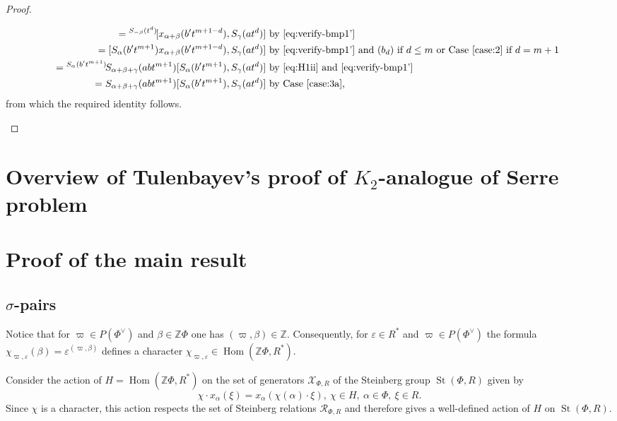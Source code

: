\documentclass[oneside, 10pt]{amsart}
\DeclareMathOperator{\St}{St}
\DeclareMathOperator{\Hom}{Hom}
\newcommand{\ZZ}{\mathbb{Z}}
\numberwithin{equation}{section}
\numberwithin{lemma}{section}
\theoremstyle{definition}
\theoremstyle{remark}
\begin{document}
\begin{proof}
\begin{enumerate}
\begin{enumerate}
\begin{align*}
 = {}^{S_{-\beta}(t^d)}\![x_{\alpha+\beta}(b't^{m+1-d}), S_\gamma(at^d)] & \text{ by~\eqref{eq:verify-bmp1'}} \\
 = [S_{\alpha}(b't^{m+1}) x_{\alpha+\beta}(b't^{m+1-d}), S_\gamma(at^d)] & \text{ by~\eqref{eq:verify-bmp1'} and $(b_d)$ if $d\leq m$ or Case~\eqref{case:2} if $d=m+1$ }\\
 = {}^{S_{\alpha}(b't^{m+1})}\!S_{\alpha+\beta+\gamma}(abt^{m+1}) [S_{\alpha}(b't^{m+1}), S_\gamma(at^d)] & \text{ by~\eqref{eq:H1ii} and~\eqref{eq:verify-bmp1'}} \\
 = S_{\alpha+\beta+\gamma}(abt^{m+1}) [S_{\alpha}(b't^{m+1}), S_\gamma(at^d)] & \text{ by Case~\eqref{case:3a},}
\end{align*}
from which the required identity follows. \qedhere
\end{enumerate}
\end{enumerate}
\end{proof}


\section{Overview of Tulenbayev's proof of $K_2$-analogue of Serre problem}

\section{Proof of the main result}

\subsection{$\sigma$-pairs}
Notice that for $\varpi \in P(\Phi^\vee)$ and $\beta \in \ZZ \Phi$ one has $(\varpi, \beta) \in \ZZ $.
Consequently, for $\varepsilon \in R^*$ and $\varpi \in P(\Phi^\vee)$ the formula $\chi_{\varpi, \varepsilon}(\beta) = \varepsilon ^ {(\varpi, \beta)}$
defines a character $\chi_{\varpi, \varepsilon} \in \Hom(\ZZ \Phi, R^*)$.

Consider the action of $H=\Hom(\ZZ \Phi, R^*)$ on the set of generators $\mathcal{X}_{\Phi, R}$ of the Steinberg group $\St(\Phi, R)$ given by
\begin{equation} \chi \cdot x_\alpha(\xi) = x_\alpha(\chi(\alpha) \cdot \xi),\ \chi \in H,\ \alpha\in \Phi,\ \xi \in R. \end{equation}
Since $\chi$ is a character, this action respects the set of Steinberg relations $\mathcal{R}_{\Phi, R}$ and therefore gives a well-defined action of $H$ on $\St(\Phi, R)$.
\end{document}
